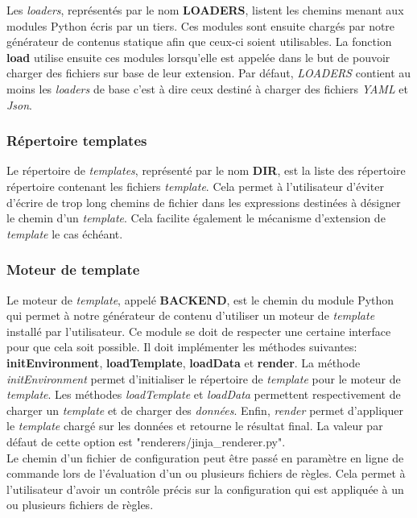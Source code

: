 		Les \textit{loaders}, représentés par le nom \textbf{LOADERS}, listent les chemins menant aux modules Python écris par un tiers. Ces modules sont ensuite chargés par notre générateur de contenus statique afin que ceux-ci soient utilisables. La fonction \textbf{load} utilise ensuite ces modules lorsqu'elle est appelée dans le but de pouvoir charger des fichiers sur base de leur extension. Par défaut, \textit{LOADERS} contient au moins les \textit{loaders} de base c'est à dire ceux destiné à charger des fichiers \textit{YAML} et \textit{Json}.\\
		
		\subsubsection*{Répertoire templates}
		
		Le répertoire de \textit{templates}, représenté par le nom \textbf{DIR}, est la liste des répertoire répertoire contenant les fichiers \textit{template}. Cela permet à l'utilisateur d'éviter d'écrire de trop long chemins de fichier dans les expressions destinées à désigner le chemin d'un \textit{template}. Cela facilite également le mécanisme d'extension de \textit{template} le cas échéant.
				
		\subsubsection*{Moteur de template}
		
		Le moteur de \textit{template}, appelé \textbf{BACKEND}, est le chemin du module Python qui permet à notre générateur de contenu d'utiliser un moteur de \textit{template} installé par l'utilisateur. Ce module se doit de respecter une certaine interface pour que cela soit possible. Il doit implémenter les méthodes suivantes: \textbf{initEnvironment}, \textbf{loadTemplate}, \textbf{loadData} et \textbf{render}. La méthode \textit{initEnvironment} permet d'initialiser le répertoire de \textit{template} pour le moteur de \textit{template}. Les méthodes \textit{loadTemplate} et \textit{loadData} permettent respectivement de charger un \textit{template} et de charger des \textit{données}. Enfin, \textit{render} permet d'appliquer le \textit{template} chargé sur les données et retourne le résultat final. La valeur par défaut de cette option est "renderers/jinja\_renderer.py".\\
		
		Le chemin d'un fichier de configuration peut être passé en paramètre en ligne de commande lors de l'évaluation d'un ou plusieurs fichiers de règles. Cela permet à l'utilisateur d'avoir un contrôle précis sur la configuration qui est appliquée à un ou plusieurs fichiers de règles.
		
